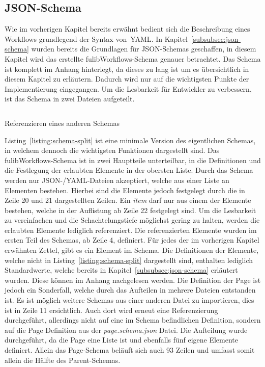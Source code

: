 \subsection{JSON-Schema}\label{subsec:schema}
Wie im vorherigen Kapitel bereits erwähnt bedient sich die Beschreibung eines Workflows grundlegend der Syntax von~\ac*{YAML}.
In Kapitel~\ref{subsubsec:json-schema} wurden bereits die Grundlagen für JSON-Schemas geschaffen, in diesem Kapitel wird das erstellte
fulibWorkflows-Schema genauer betrachtet.
Das Schema ist komplett im Anhang hinterlegt, da dieses zu lang ist um es übersichtlich in diesem Kapitel zu erläutern.
Dadurch wird nur auf die wichtigsten Punkte der Implementierung eingegangen.
Um die Lesbarkeit für Entwickler zu verbessern, ist das Schema in zwei Dateien aufgeteilt.

\begin{listing}[!ht]
    \inputminted[xleftmargin=20pt,linenos]{json}{listings/3.1/page.json}
    \caption{Referenzieren eines anderen Schemas}
    \label{listing:schema-split}
\end{listing}

Listing~\ref{listing:schema-split} ist eine minimale Version des eigentlichen Schemas, in welchem dennoch die wichtigsten Funktionen dargestellt sind.
Das fulibWorkflows-Schema ist in zwei Hauptteile unterteilbar, in die Definitionen und die Festlegung der erlaubten Elemente in der obersten Liste.
Durch das Schema werden nur JSON-/YAML-Dateien akzeptiert, welche aus einer Liste an Elementen bestehen.
Hierbei sind die Elemente jedoch festgelegt durch die in Zeile 20 und 21 dargestellten Zeilen.
Ein \textit{item} darf nur aus einem der Elemente bestehen, welche in der Auflistung ab Zeile 22 festgelegt sind.
Um die Lesbarkeit zu vereinfachen und die Schachtelungstiefe möglichst gering zu halten, werden die erlaubten Elemente lediglich referenziert.
Die referenzierten Elemente wurden im ersten Teil des Schemas, ab Zeile 4, definiert.
Für jedes der im vorherigen Kapitel erwähnten Zettel, gibt es ein Element im Schema.
Die Definitionen der Elemente, welche nicht in Listing~\ref{listing:schema-split} dargestellt sind, enthalten lediglich Standardwerte, welche bereits in Kapitel~\ref{subsubsec:json-schema} erläutert wurden.
Diese können im Anhang nachgelesen werden.
Die Definition der Page ist jedoch ein Sonderfall, welche durch das Aufteilen in mehrere Dateien entstanden ist.
Es ist möglich weitere Schemas aus einer anderen Datei zu importieren, dies ist in Zeile 11 ersichtlich.
Auch dort wird erneut eine Referenzierung durchgeführt, allerdings nicht auf eine im Schema befindlichen Definition, sondern auf die Page Definition aus der \textit{page.schema.json} Datei.
Die Aufteilung wurde durchgeführt, da die Page eine Liste ist und ebenfalls fünf eigene Elemente definiert.
Allein das Page-Schema beläuft sich auch 93 Zeilen und umfasst somit allein die Hälfte des Parent-Schemas.

